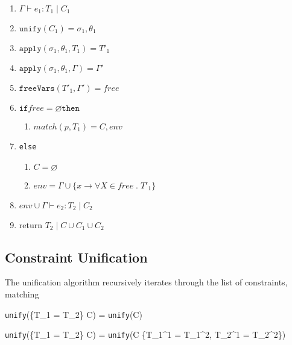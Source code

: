 \documentclass{article}
\begin{document}
\begin{enumerate}
  \item $\Gamma \vdash e_1 : T_1 \; | \; C_1$

  \item $\texttt{unify}(C_1) = \sigma_1, \theta_1$

  \item $\texttt{apply}(\sigma_1, \theta_1, T_1) = T'_1$

  \item $\texttt{apply}(\sigma_1, \theta_1, \Gamma) = \Gamma'$

  \item $\texttt{freeVars}(T'_1, \Gamma') = free$

  \item $\texttt{if} free = \varnothing \texttt{then}$

  \begin{enumerate}
    \item $match(p, T_1) = C, env$
  \end{enumerate}

  \item \texttt{else}

  \begin{enumerate}
    \item $C = \varnothing$
    \item $env = \Gamma \cup \{x \rightarrow \forall X \in free \; . \; T'_1 \}$
  \end{enumerate}

  \item $env \cup \Gamma \vdash e_2 : T_2 \; | \; C_2$

  \item return $T_2 \; | \; C \cup C_1 \cup C_2$

\end{enumerate}

\subsection{Constraint Unification}

The unification algorithm recursively iterates through the list of constraints, matching


    {\texttt{unify}(\{T_1 = T_2\} \cup C) = \texttt{unify}(C)}

    {\texttt{unify}(\{T_1 = T_2\} \cup C) = \texttt{unify}(C \cup \{T_1^1 = T_1^2, T_2^1 = T_2^2\})}
\end{document}
